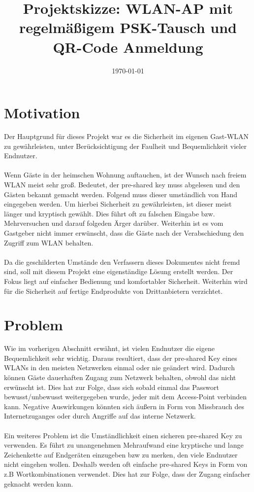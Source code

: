 \documentclass[a4paper,11pt,singlespacing]{article}
\title{Projektskizze: WLAN-AP mit regelmäßigem PSK-Tausch und QR-Code Anmeldung}
\date{\today}
\begin{document}
	\setlength{\parindent}{0ex}
	\maketitle
	
	\section{Motivation}
		Der Hauptgrund für dieses Projekt war es die Sicherheit im eigenen Gast-WLAN zu gewährleisten, unter Berücksichtigung der Faulheit und Bequemlichkeit vieler Endnutzer. \\ \\
	Wenn Gäste in der heimschen Wohnung auftauchen, ist der Wunsch nach freiem WLAN meist sehr groß. Bedeutet, der pre-shared key muss abgelesen und den Gästen bekannt gemacht werden. Folgend muss dieser umständlich von Hand eingegeben werden. Um hierbei Sicherheit zu gewährleisten, ist dieser meist länger und kryptisch gewählt. Dies führt oft zu falschen Eingabe bzw. Mehrversuchen und darauf folgeden Ärger darüber. Weiterhin ist es vom Gastgeber nicht immer erwünscht, dass die Gäste nach der Verabschiedung den Zugriff zum WLAN behalten. \\ \\
	Da die geschilderten Umstände den Verfassern dieses Dokumentes nicht fremd sind, soll mit diesem Projekt eine eigenständige Lösung erstellt werden. Der Fokus liegt auf einfacher Bedienung und komfortabler Sicherheit. Weiterhin wird für die Sicherheit auf fertige Endprodukte von Drittanbietern verzichtet. 
	
	\section{Problem}
		Wie im vorherigen Abschnitt erwähnt, ist vielen Endnutzer die eigene Bequemlichkeit sehr wichtig. Daraus resultiert, dass der pre-shared Key eines WLANs in den meisten Netzwerken einmal oder nie geändert wird. Dadurch können Gäste dauerhaften Zugang zum Netzwerk behalten, obwohl das nicht erwünscht ist.  
	Dies hat zur Folge, dass sich sobald einmal das Passwort  bewusst/unbewusst weitergegeben wurde, jeder mit dem Access-Point verbinden kann. Negative Auswirkungen könnten sich äußern in Form von Missbrauch des Internetzuganges oder durch Angriffe auf das interne Netzwerk. \\ \\ 
	Ein weiteres Problem ist die Umständlichkeit einen sicheren pre-shared Key zu verwenden. Es führt zu unangenehmen Mehraufwand eine kryptische und lange Zeichenkette auf Endgeräten einzugeben bzw zu merken, den viele Endnutzer nicht eingehen wollen. Deshalb werden oft einfache pre-shared Keys in Form von z.B Wortkombinationen verwendet. Dies hat zur Folge, dass der Zugang einfacher geknacht werden kann.
	
\end{document}
